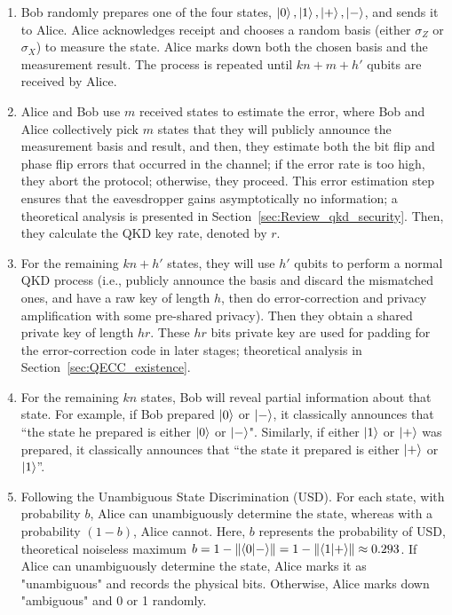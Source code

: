 \documentclass[%
 reprint,
superscriptaddress,
 amsmath,amssymb,
 aps,
]{revtex4-2}
\begin{document}
\begin{enumerate}

    \item Bob randomly prepares one of the four states, $\ket{0}, \ket{1}, \ket{+}, \ket{-}$, and sends it to Alice. Alice acknowledges receipt and chooses a random basis (either $\sigma_Z$ or $\sigma_X$) to measure the state. Alice marks down both the chosen basis and the measurement result. The process is repeated until $kn+m+h'$ qubits are received by Alice.

    \item Alice and Bob use $m$ received states to estimate the error, where Bob and Alice collectively pick $m$ states that they will publicly announce the measurement basis and result, and then, they estimate both the bit flip and phase flip errors that occurred in the channel; if the error rate is too high, they abort the protocol; otherwise, they proceed. This error estimation step ensures that the eavesdropper gains asymptotically no information; a theoretical analysis is presented in Section~\ref {sec:Review_qkd_security}. Then, they calculate the QKD key rate, denoted by $r$.

    \item For the remaining $kn+h'$ states, they will use $h'$ qubits to perform a normal QKD process (i.e., publicly announce the basis and discard the mismatched ones, and have a raw key of length $h$, then do error-correction and privacy amplification with some pre-shared privacy). Then they obtain a shared private key of length $hr$. These $hr$ bits private key are used for padding for the error-correction code in later stages; theoretical analysis in Section~\ref{sec:QECC_existence}. 

    \item For the remaining $kn$ states, Bob will reveal partial information about that state. For example, if Bob prepared $\ket{0}$ or $\ket{-}$, it classically announces that ``the state he prepared is either $\ket{0}$ or $\ket{-}$". Similarly, if either $\ket{1}$ or $\ket{+}$ was prepared, it classically announces that ``the state it prepared is either $\ket{+}$ or $\ket{1}$''. 

    \item Following the Unambiguous State Discrimination (USD). For each state, with probability $b$, Alice can unambiguously determine the state, whereas with a probability $(1-b)$, Alice cannot. Here, $b$ represents the probability of USD, theoretical noiseless maximum $b = 1-\norm{\bra{0}\ket{-}} = 1-\norm{\bra{1}\ket{+}} \approx 0.293$. If Alice can unambiguously determine the state, Alice marks it as "unambiguous" and records the physical bits. Otherwise, Alice marks down "ambiguous" and 0 or 1 randomly.


\end{enumerate}
\end{document}
